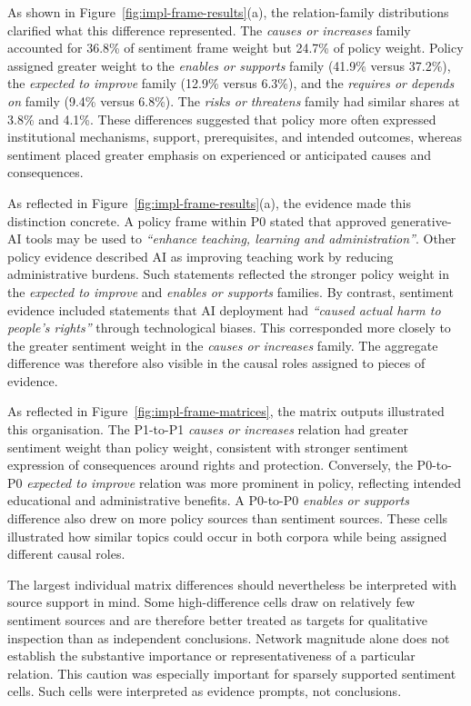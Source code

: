 As shown in Figure~\ref{fig:impl-frame-results}(a), the relation-family
distributions clarified what this difference represented. The \textit{causes or
increases} family accounted for 36.8\% of sentiment frame weight but 24.7\% of
policy weight. Policy assigned greater weight to the \textit{enables or supports}
family (41.9\% versus 37.2\%), the \textit{expected to improve} family
(12.9\% versus 6.3\%), and the \textit{requires or depends on} family
(9.4\% versus 6.8\%). The \textit{risks or threatens} family had similar shares
at 3.8\% and 4.1\%. These differences suggested that policy more often expressed
institutional mechanisms, support, prerequisites, and intended outcomes, whereas
sentiment placed greater emphasis on experienced or anticipated causes and
consequences.

As reflected in Figure~\ref{fig:impl-frame-results}(a), the evidence made this
distinction concrete. A policy frame within P0 stated that approved generative-AI
tools may be used to \textit{``enhance teaching, learning and administration''}.
Other policy evidence described AI as improving teaching work by reducing
administrative burdens. Such statements reflected the stronger policy weight in the
\textit{expected to improve} and \textit{enables or supports} families. By contrast,
sentiment evidence included statements that AI deployment had
\textit{``caused actual harm to people's rights''} through technological biases.
This corresponded more closely to the greater sentiment weight in the
\textit{causes or increases} family. The aggregate difference was therefore also
visible in the causal roles assigned to pieces of evidence.

As reflected in Figure~\ref{fig:impl-frame-matrices}, the matrix outputs illustrated
this organisation. The P1-to-P1 \textit{causes or increases} relation had greater
sentiment weight than policy weight, consistent with stronger sentiment expression
of consequences around rights and protection. Conversely, the P0-to-P0
\textit{expected to improve} relation was more prominent in policy, reflecting
intended educational and administrative benefits. A P0-to-P0
\textit{enables or supports} difference also drew on more policy sources than
sentiment sources. These cells illustrated how similar topics could occur in both
corpora while being assigned different causal roles.

The largest individual matrix differences should nevertheless be interpreted with
source support in mind. Some high-difference cells draw on relatively few sentiment
sources and are therefore better treated as targets for qualitative inspection than
as independent conclusions. Network magnitude alone does not establish the
substantive importance or representativeness of a particular relation. This caution
was especially important for sparsely supported sentiment cells. Such cells were
interpreted as evidence prompts, not conclusions.

